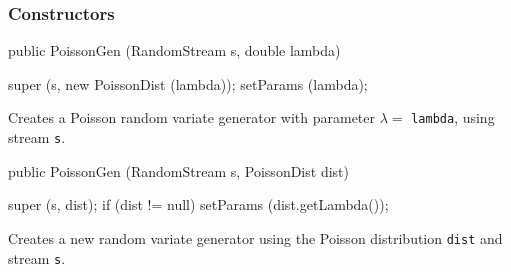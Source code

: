 \subsubsection* {Constructors}
\begin{code}

   public PoissonGen (RandomStream s, double lambda) \begin{hide} {
      super (s, new PoissonDist (lambda));
      setParams (lambda);
   }\end{hide}
\end{code}
  \begin{tabb}  Creates a Poisson random variate generator with 
  parameter $\lambda = $ \texttt{lambda}, using stream \texttt{s}. 
 \end{tabb}
\begin{code}

   public PoissonGen (RandomStream s, PoissonDist dist) \begin{hide} {
      super (s, dist);
      if (dist != null)
         setParams (dist.getLambda());
   }\end{hide}
\end{code}
  \begin{tabb}  Creates a new random variate generator using the Poisson 
    distribution \texttt{dist} and stream \texttt{s}. 
 \end{tabb}


